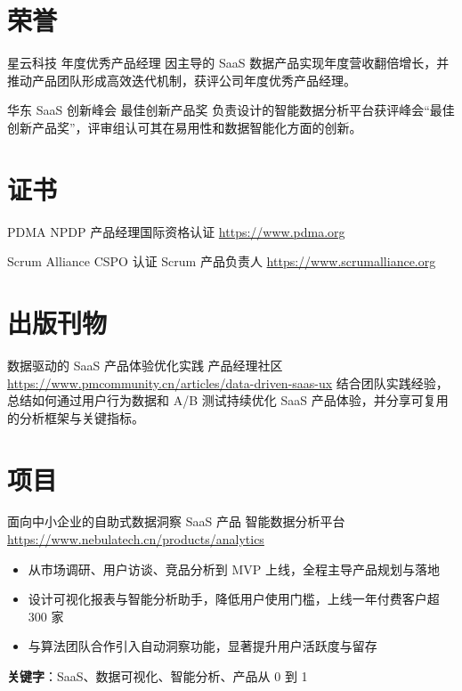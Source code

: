 \documentclass[a4paper, serif, 10pt]{moderncv}
\begin{document}
\section{荣誉}

        {星云科技}
        {年度优秀产品经理}
        {}
        {}
        {因主导的 SaaS 数据产品实现年度营收翻倍增长，并推动产品团队形成高效迭代机制，获评公司年度优秀产品经理。}

        {华东 SaaS 创新峰会}
        {最佳创新产品奖}
        {}
        {}
        {负责设计的智能数据分析平台获评峰会“最佳创新产品奖”，评审组认可其在易用性和数据智能化方面的创新。}
\section{证书}

        {PDMA}
        {NPDP 产品经理国际资格认证}
        {\url{https://www.pdma.org}}
        {}
        {}

        {Scrum Alliance}
        {CSPO 认证 Scrum 产品负责人}
        {\url{https://www.scrumalliance.org}}
        {}
        {}
\section{出版刊物}

        {数据驱动的 SaaS 产品体验优化实践}
        {产品经理社区}
        {\url{https://www.pmcommunity.cn/articles/data-driven-saas-ux}}
        {}
        {结合团队实践经验，总结如何通过用户行为数据和 A/B 测试持续优化 SaaS 产品体验，并分享可复用的分析框架与关键指标。}
\section{项目}

        {面向中小企业的自助式数据洞察 SaaS 产品}
        {智能数据分析平台}
        {\url{https://www.nebulatech.cn/products/analytics}}
        {}
        {\begin{itemize}
\item 从市场调研、用户访谈、竞品分析到 MVP 上线，全程主导产品规划与落地
\item 设计可视化报表与智能分析助手，降低用户使用门槛，上线一年付费客户超 300 家
\item 与算法团队合作引入自动洞察功能，显著提升用户活跃度与留存
\end{itemize}
\textbf{关键字}：SaaS、数据可视化、智能分析、产品从 0 到 1}
\end{document}
